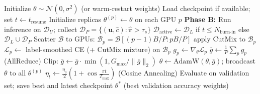 \documentclass[12pt, a4paper]{article}
\begin{document}
\begin{algorithm}[H]
\caption{Ultimate Teacher Training Pipeline}
\begin{algorithmic}[1]
\State Initialize $\theta \sim \mathcal{N}(0, \sigma^2)$ (or warm-restart weights)
\State Load checkpoint if available; set $t \leftarrow t_{\text{resume}}$
\State Initialize replicas $\theta^{(p)} \leftarrow \theta$ on each GPU $p$
    \State \textbf{Phase B:} Run inference on $\mathcal{D}_U$; collect $\mathcal{D}_P = \{(\mathbf{u}, \hat{c}) : \hat{\pi} > \tau_s\}$
  \EndIf
  \State $\mathcal{D}_{\text{active}} \leftarrow \mathcal{D}_L$ if $t \leq N_{\text{burn-in}}$ else $\mathcal{D}_L \cup \mathcal{D}_P$
    \State Scatter $\mathcal{B}$ to GPUs: $\mathcal{B}_p = \mathcal{B}[(p-1)B/P : pB/P]$
       apply CutMix to $\mathcal{B}_p$
      \EndIf
      \State $\mathcal{L}_p \leftarrow$ label-smoothed CE (+ CutMix mixture) on $\mathcal{B}_p$
      \State $g_p \leftarrow \nabla_\theta \mathcal{L}_p$
    \EndFor
    \State $\bar{g} \leftarrow \frac{1}{P}\sum_p g_p$ \hfill (AllReduce)
    \State Clip: $\bar{g} \leftarrow \bar{g} \cdot \min(1, G_{\max}/\|\bar{g}\|_2)$
    \State $\theta \leftarrow \text{AdamW}(\theta, \bar{g})$; broadcast $\theta$ to all $\theta^{(p)}$
  \EndFor
  \State $\eta_t \leftarrow \frac{\eta_0}{2}\!\left(1 + \cos\!\frac{\pi t}{T_{\max}}\right)$ \hfill (Cosine Annealing)
  \State Evaluate on validation set; save best and latest checkpoint
\EndFor
\State \Return $\theta^*$ (best validation accuracy weights)
\end{algorithmic}
\end{algorithm}
\end{document}
